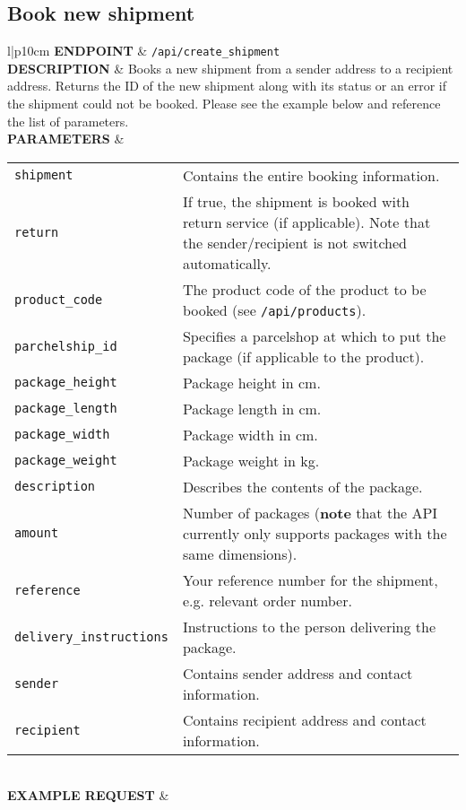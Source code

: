 \documentclass{article}
\begin{document}
\newpage
\subsection{Book new shipment}
\begin{longtable}{l|p{10cm}}
	\textbf{ENDPOINT} & \verb|/api/create_shipment|\\
	\textbf{DESCRIPTION} & Books a new shipment from a sender address to a recipient address. Returns the ID of the new shipment along with its status or an error if the shipment could not be booked. Please see the example below and reference the list of parameters.\\
	\textbf{PARAMETERS} & 
	\begin{tabular}{l|p{7cm}}
		\verb|shipment| & Contains the entire booking information.\\
		\verb|return| & If true, the shipment is booked with return service (if applicable). Note that the sender/recipient is not switched automatically.\\
		\verb|product_code| & The product code of the product to be booked (see \verb|/api/products|).\\
		\verb|parchelship_id| & Specifies a parcelshop at which to put the package (if applicable to the product).\\
		\verb|package_height| & Package height in cm. \\
		\verb|package_length| & Package length in cm. \\
		\verb|package_width| & Package width in cm. \\
		\verb|package_weight| & Package weight in kg.\\
		\verb|description| & Describes the contents of the package. \\
		\verb|amount| & Number of packages (\textbf{note} that the API currently only supports packages with the same dimensions).\\
		\verb|reference| & Your reference number for the shipment, e.g. relevant order number.\\
		\verb|delivery_instructions| & Instructions to the person delivering the package.\\
		\verb|sender| & Contains sender address and contact information.\\
		\verb|recipient| & Contains recipient address and contact information.\\
	\end{tabular}\\
	\textbf{EXAMPLE REQUEST} & \begin{lstlisting}

\end{lstlisting}
\end{longtable}
\end{document}

